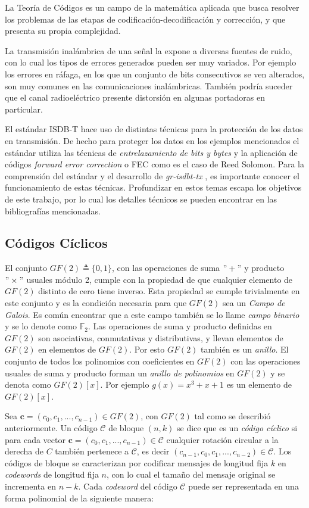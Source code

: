 La Teoría de Códigos es un campo de la matemática aplicada que busca resolver los problemas de las etapas de codificación-decodificación y corrección, y que presenta su propia complejidad.

La transmisión inalámbrica de una señal la expone a diversas fuentes de ruido, con lo cual los tipos de errores generados pueden ser muy variados. Por ejemplo los errores en ráfaga, en los que un conjunto de bits consecutivos se ven alterados, son muy comunes en las comunicaciones inalámbricas. También podría suceder que el canal radioeléctrico presente distorsión en algunas portadoras en particular.

El estándar ISDB-T hace uso de distintas técnicas para la protección de los datos en transmisión. De hecho para proteger los datos en los ejemplos mencionados el estándar utiliza las técnicas de \textit{entrelazamiento de bits y bytes} y la aplicación de códigos \textit{forward error correction} o FEC como es el caso de Reed Solomon. Para la comprensión del estándar y el desarrollo de \textit{gr-isdbt-tx} \cite{gr-isdbt-tx}, es importante conocer el funcionamiento de estas técnicas. Profundizar en estos temas escapa los objetivos de este trabajo, por lo cual los detalles técnicos se pueden encontrar en las bibliografías mencionadas.


\subsection{Códigos Cíclicos}
El conjunto $GF(2) \triangleq \{0,1\}$, con las operaciones de suma $" + "$ y producto $" \times "$ usuales módulo 2, cumple con la propiedad de que cualquier elemento de $GF(2)$ distinto de cero tiene inverso. Esta propiedad se cumple trivialmente en este conjunto y es la condición necesaria para que $GF(2)$ sea un \textit{Campo de Galois}. Es común encontrar que a este campo también se lo llame \textit{campo binario} y se lo denote como $\mathbb {F}_2$.
Las operaciones de suma y producto definidas en $GF(2)$ son asociativas, conmutativas y distributivas, y llevan elementos de $GF(2)$ en elementos de $GF(2)$. Por esto $GF(2)$ también es un \textit{anillo}. 
El conjunto de todos los polinomios con coeficientes en $GF(2)$ con las operaciones usuales de suma y producto forman un \textit{anillo de polinomios} en $GF(2)$ y se denota como $GF(2)[x]$. Por ejemplo $g(x) = x^3 + x + 1$ es un elemento de $GF(2)[x]$.

Sea $\textbf{c} = (c_0, c_1, ..., c_{n-1}) \in GF(2)$, con $GF(2)$ tal como se describió anteriormente. Un código $\mathcal{C}$ de bloque $(n, k)$ se dice que es un \textit{código cíclico} si para cada vector $\textbf{c} = (c_0, c_1, ..., c_{n-1}) \in \mathcal{C}$ cualquier rotación circular a la derecha de $C$ también pertenece a $\mathcal{C}$, es decir $(c_{n-1}, c_0, c_1, ..., c_{n-2}) \in \mathcal{C}$.
Los códigos de bloque se caracterizan por codificar mensajes de longitud fija $k$ en \textit{codewords} de longitud fija $n$, con lo cual el tamaño del mensaje original se incrementa en $n-k$.
Cada \textit{codeword} del código $\mathcal{C}$ puede ser representada en una forma polinomial de la siguiente manera:

